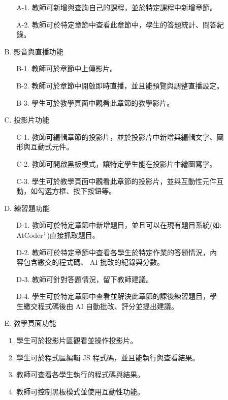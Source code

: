 \documentclass[12pt]{article}
\begin{document}
\begin{enumerate}
\begin{enumerate}
\begin{enumerate}[itemindent=24pt]
            \begin{enumerate}[itemindent=24pt]
              \item [A-1.] 教師可新增與查詢自己的課程，並於特定課程中新增章節。
              \item [A-2.] 教師可於特定章節中查看此章節中，學生的答題統計、問答紀錄。
            \end{enumerate}
          \item [B.] 影音與直播功能
            \begin{enumerate}[itemindent=24pt]
              \item [B-1.] 教師可於章節中上傳影片。
              \item [B-2.] 教師可於章節中開啟即時直播，並且能預覽與調整直播設定。
              \item [B-3.] 學生可於教學頁面中觀看此章節的教學影片。
            \end{enumerate}
          \item [C.] 投影片功能
            \begin{enumerate}[itemindent=24pt]
              \item [C-1.] 教師可編輯章節的投影片，並於投影片中新增與編輯文字、圖形與互動式元件。
              \item [C-2.] 教師可開啟黑板模式，讓特定學生能在投影片中繪圖寫字。
              \item [C-3.] 學生可於教學頁面中觀看此章節的投影片，並與互動性元件互動，如勾選方框、按下按鈕等。
            \end{enumerate}
          \item [D.] 練習題功能
            \begin{enumerate}[itemindent=24pt]
              \item [D-1.] 教師可於特定章節中新增題目，並且可以在現有題目系統(如: AtCoder$\footnote{https://atcoder.jp/}$)直接抓取題目。
              \item [D-2.] 教師可於特定章節中查看各學生於特定作業的答題情況，內容包含繳交的程式碼、 AI 批改的紀錄與分數。
              \item [D-3.] 教師可針對答題情況，留下教師建議。
              \item [D-4.] 學生可於特定章節中查看並解決此章節的課後練習題目，學生繳交程式碼後由 AI 自動批改、評分並提出建議。
            \end{enumerate}
          \item [E.] 教學頁面功能
            \begin{enumerate}[itemindent=24pt, label=E-\arabic*.]
              \item 學生可於投影片區觀看並操作投影片。
              \item 學生可於程式區編輯 JS 程式碼，並且能執行與查看結果。
              \item 教師可查看各學生執行的程式碼與結果。
              \item 教師可控制黑板模式並使用互動性功能。
            \end{enumerate}
          \end{enumerate}


\end{enumerate}
\end{enumerate}
\end{document}
